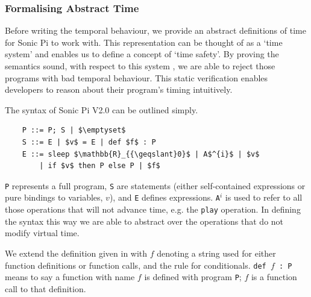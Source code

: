 \documentclass[11pt, abstracton, twoside, titlepage=true]{scrartcl}
\begin{document}
\subsubsection{Formalising Abstract Time} \label{abstractTime}
Before writing the temporal behaviour, we provide an abstract definitions of time 
for Sonic Pi to work with. This representation can be thought of as a `time system' 
and enables us to define a concept of `time safety'. By proving the semantics sound, 
with respect to this system \cite{AOB14}, we are able to reject those programs with 
bad temporal behaviour. This static verification enables developers to reason about 
their program's timing intuitively.

The syntax of Sonic Pi V2.0 can be outlined simply.
\\
\begin{lstlisting}
	P ::= P; S | $\emptyset$
	S ::= E | $v$ = E | def $f$ : P 
	E ::= sleep $\mathbb{R}_{{\geqslant}0}$ | A$^{i}$ | $v$ 
	    | if $v$ then P else P | $f$
\end{lstlisting}

\texttt{P} represents a full program, 
\texttt{S} are statements (either self-contained expressions or pure bindings 
to variables, $v$), and \texttt{E} defines expressions. \texttt{A$^{i}$} is used to 
refer to all those operations that will not advance time, e.g. the 
\texttt{play} operation. In defining the syntax this way we are able to abstract 
over the operations that do not modify virtual time.

We extend the definition given in \cite{AOB14} with $f$ denoting a string used for 
either function definitions or function calls, and the rule for conditionals. 
\texttt{def $f$ : P} means to say a function with name $f$ is defined with program 
\texttt{P}; $f$ is a function call to that definition.
\end{document}
